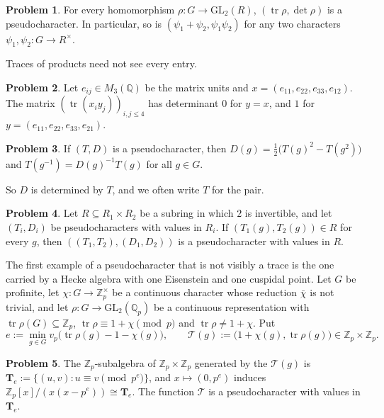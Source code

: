 \documentclass[reqno]{amsart}
\theoremstyle{definition}
\newtheorem{problem}{Problem}[section]
\theoremstyle{plain}
\newcommand{\Z}{\mathbb{Z}}
\newcommand{\Q}{\mathbb{Q}}
\newcommand{\Zp}{\Z_p}
\newcommand{\Qp}{\Q_p}
\newcommand{\Tb}{\mathbf{T}}
\newcommand{\tr}{\operatorname{tr}}
\begin{document}
\begin{problem}\label{pr:trace-pc}
For every homomorphism \(\rho \colon G \to \mathrm{GL}_2(R)\), \((\tr\rho, \det\rho)\) is a pseudocharacter.  In particular, so is \((\psi_1 + \psi_2, \psi_1\psi_2)\) for any two characters \(\psi_1, \psi_2 \colon G \to R^\times\).
\end{problem}

Traces of products need not see every entry.

\begin{problem}\label{pr:trace-form}
Let \(e_{ij} \in M_3(\Q)\) be the matrix units and \(x = (e_{11}, e_{22}, e_{33}, e_{12})\).  The matrix \((\tr(x_iy_j))_{i,j \le 4}\) has determinant \(0\) for \(y = x\), and \(1\) for \(y = (e_{11}, e_{22}, e_{33}, e_{21})\).
\end{problem}

\begin{problem}\label{pr:D-from-T}
If \((T, D)\) is a pseudocharacter, then \(D(g) = \tfrac12\bigl(T(g)^2 - T(g^2)\bigr)\) and \(T(g^{-1}) = D(g)^{-1} T(g)\) for all \(g \in G\).
\end{problem}

So \(D\) is determined by \(T\), and we often write \(T\) for the pair.

\begin{problem}\label{pr:subring}
Let \(R \subseteq R_1 \times R_2\) be a subring in which \(2\) is invertible, and let \((T_i, D_i)\) be pseudocharacters with values in \(R_i\).  If \((T_1(g), T_2(g)) \in R\) for every \(g\), then \(((T_1, T_2), (D_1, D_2))\) is a pseudocharacter with values in \(R\).
\end{problem}

The first example of a pseudocharacter that is not visibly a trace is the one carried by a Hecke algebra with one Eisenstein and one cuspidal point.  Let \(G\) be profinite, let \(\chi \colon G \to \Zp^\times\) be a continuous character whose reduction \(\bar\chi\) is not trivial, and let \(\rho \colon G \to \mathrm{GL}_2(\Qp)\) be a continuous representation with \(\tr\rho(G) \subseteq \Zp\), \(\tr \rho \equiv 1 + \chi \pmod p\) and \(\tr\rho \ne 1 + \chi\).  Put
\[
  e := \min_{g \in G} v_p\bigl(\tr\rho(g) - 1 - \chi(g)\bigr), \qquad \mathcal{T}(g) := \bigl(1 + \chi(g), \tr\rho(g)\bigr) \in \Zp \times \Zp .
\]

\begin{problem}\label{pr:toy-hecke}
The \(\Zp\)-subalgebra of \(\Zp \times \Zp\) generated by the \(\mathcal{T}(g)\) is \(\Tb_e := \{(u, v) : u \equiv v \pmod{p^e}\}\), and \(x \mapsto (0, p^e)\) induces \(\Zp[x]/(x(x - p^e)) \cong \Tb_e\).  The function \(\mathcal{T}\) is a pseudocharacter with values in \(\Tb_e\).
\end{problem}
\end{document}
